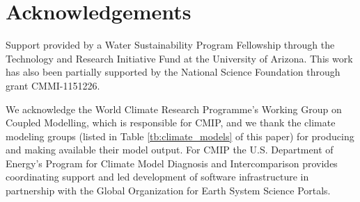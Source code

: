 \documentclass[opre,nonblindrev]{informs3} %
\begin{document}


%

\section*{Acknowledgements}
Support provided by a Water Sustainability Program Fellowship through the Technology and Research Initiative Fund at the University of Arizona.
This work has also been partially supported by the National Science Foundation through grant CMMI-1151226.

We acknowledge the World Climate Research Programme's Working Group on Coupled Modelling, which is responsible for CMIP, and we thank the climate modeling groups (listed in Table \ref{tb:climate_models} of this paper) for producing and making available their model output.
For CMIP the U.S. Department of Energy's Program for Climate Model Diagnosis and Intercomparison provides coordinating support and led development of software infrastructure in partnership with the Global Organization for Earth System Science Portals.







\end{document}
